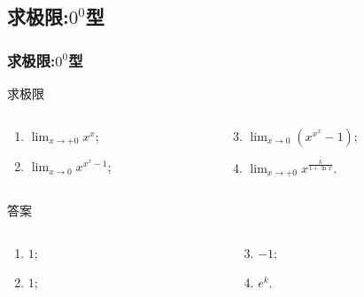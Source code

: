 \documentclass[
10pt,
aspectratio=43,
]{beamer}
\begin{document}
\subsection{求极限:$\displaystyle0^0$型}
\begin{frame}
	\frametitle{求极限:$\displaystyle0^0$型}
	\everymath{\displaystyle}
	\begin{block}{求极限}
		\begin{columns}[t]
			\begin{column}{0.5\textwidth}
				\begin{enumerate}
					\item $\lim _{x \rightarrow+0} x^x$;
					\item $\lim _{x \rightarrow 0} x^{x^x-1}$;
				\end{enumerate}
			\end{column}
			\begin{column}{0.5\textwidth}
				\begin{enumerate}
					\setcounter{enumi}{2}
					\item $\lim _{x \rightarrow 0}\left(x^{x^x}-1\right)$;
					\item $\lim _{x \rightarrow+0} x^{\frac{k}{1+\ln x}}$.
				\end{enumerate}
			\end{column}
		\end{columns}
	\end{block}

	\begin{exampleblock}{答案}
		\begin{columns}[t]
			\begin{column}{0.5\textwidth}
				\begin{enumerate}
					\pause
					\item $1$;
					\item $1$;
				\end{enumerate}
			\end{column}
			\begin{column}{0.5\textwidth}
				\begin{enumerate}
					\setcounter{enumi}{2}
					\pause
					\item $-1$;
					\item $e^{k}$.
				\end{enumerate}
			\end{column}
		\end{columns}
	\end{exampleblock}
\end{frame}
\end{document}
